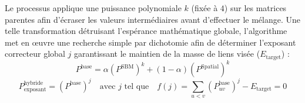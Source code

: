 Le processus applique une puissance polynomiale $k$ (fixée à $4$) sur les matrices parentes afin d'écraser les valeurs intermédiaires avant d'effectuer le mélange. Une telle transformation détruisant l'espérance mathématique globale, l'algorithme met en œuvre une recherche simple par dichotomie afin de déterminer l'exposant correcteur global $j$ garantissant le maintien de la masse de liens visée ($E_{\text{target}}$) :
\begin{equation}
    P^{\text{base}} = \alpha (P^{\text{SBM}})^k + (1-\alpha) (P^{\text{Spatial}})^k
\end{equation}
\begin{equation}
    P^{\text{hybride}}_{\text{exposant}} = (P^{\text{base}})^j \quad \text{avec $j$ tel que} \quad f(j) = \sum_{u < v} (P^{\text{base}}_{uv})^j - E_{\text{target}} = 0
\end{equation}

